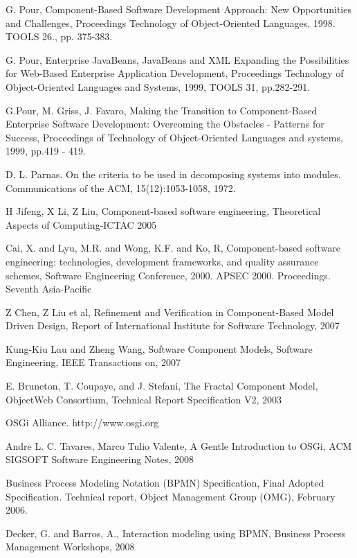 \begin{thebibliography}{99}

 G. Pour, Component-Based Software Development Approach: New Opportunities and Challenges, Proceedings Technology of Object-Oriented Languages, 1998. TOOLS 26., pp. 375-383.

  G. Pour,  Enterprise JavaBeans,  JavaBeans and XML Expanding the Possibilities for Web-Based Enterprise Application Development,  Proceedings Technology of Object-Oriented Languages and Systems, 1999, TOOLS 31, pp.282-291.

 G.Pour, M. Griss, J. Favaro, Making the Transition to Component-Based Enterprise Software Development: Overcoming the Obstacles - Patterns for Success, Proceedings of Technology of Object-Oriented Languages and systems, 1999, pp.419 - 419.

 D. L. Parnas. On the criteria to be used in decomposing systems into modules. Communications of the ACM, 15(12):1053-1058, 1972.

 H Jifeng, X Li, Z Liu, Component-based software engineering, Theoretical Aspects of Computing-ICTAC 2005

 Cai, X. and Lyu, M.R. and Wong, K.F. and Ko, R, Component-based software engineering: technologies, development frameworks, and quality assurance schemes, Software Engineering Conference, 2000. APSEC 2000. Proceedings. Seventh Asia-Pacific

 Z Chen, Z Liu et al, Refinement and Verification in Component-Based Model Driven Design, Report of International Institute for Software Technology, 2007

 Kung-Kiu Lau and Zheng Wang, Software Component Models, Software Engineering, IEEE Transactions on, 2007

 E. Bruneton, T. Coupaye, and J. Stefani, The Fractal Component Model, ObjectWeb Consortium, Technical Report Specification V2, 2003

 OSGi Alliance. http://www.osgi.org 

 Andre L. C. Tavares, Marco Tulio Valente, A Gentle Introduction to OSGi, ACM SIGSOFT Software Engineering Notes, 2008

 Business Process Modeling Notation (BPMN) Specification, Final Adopted Specification. Technical report, Object Management Group (OMG), February 2006.

 Decker, G. and Barros, A., Interaction modeling using BPMN, Business Process Management Workshops, 2008


\end{thebibliography}
